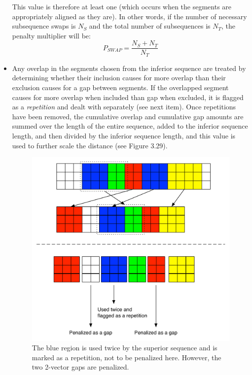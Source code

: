 \documentclass[a4paper,12pt]{report} 	%
\numberwithin{figure}{chapter}
\numberwithin{table}{chapter}
\numberwithin{equation}{chapter}
\begin{document}
\begin{flushleft}
\begin{itemize}
\begin{figure}[h!]
\end{figure}
This value is therefore at least one (which occurs when the segments are appropriately aligned as they are). In other words, if the number of necessary subsequence swaps is $N_S$ and the total number of subsequences is $N_T$, the penalty multiplier will be:
\begin{equation}
P_{SWAP} = \frac{N_S+N_T}{N_T}
\end{equation}
\item Any overlap in the segments chosen from the inferior sequence are treated by determining whether their inclusion causes for more overlap than their exclusion causes for a gap between segments. If the overlapped segment causes for more overlap when included than gap when excluded, it is flagged as a \emph{repetition} and dealt with separately (see next item). Once repetitions have been removed, the cumulative overlap and cumulative gap amounts are summed over the length of the entire sequence, added to the inferior sequence length, and then divided by the inferior sequence length, and this value is used to further scale the distance (see Figure 3.29). 
\begin{figure}[h!]
\begin{center}
\includegraphics[scale=0.7]{Penalty_2}
\caption[Penalizing Overlaps and Gaps]{The blue region is used twice by the superior sequence and is marked as a repetition, not to be penalized here. However, the two 2-vector gaps are penalized.}

\end{center}
\end{figure}
\end{itemize}
\end{flushleft}
\end{document}
